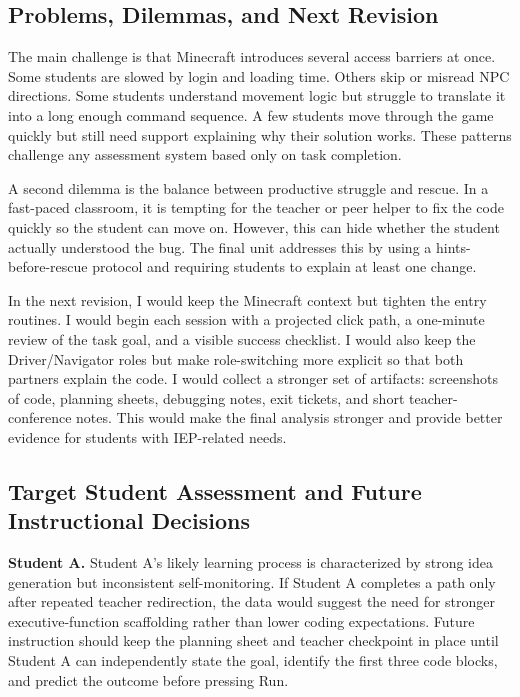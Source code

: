 \documentclass[12pt]{article}
\begin{document}
\subsection{Problems, Dilemmas, and Next Revision}

The main challenge is that Minecraft introduces several access barriers at once. Some students are slowed by login and loading time. Others skip or misread NPC directions. Some students understand movement logic but struggle to translate it into a long enough command sequence. A few students move through the game quickly but still need support explaining why their solution works. These patterns challenge any assessment system based only on task completion.

A second dilemma is the balance between productive struggle and rescue. In a fast-paced classroom, it is tempting for the teacher or peer helper to fix the code quickly so the student can move on. However, this can hide whether the student actually understood the bug. The final unit addresses this by using a hints-before-rescue protocol and requiring students to explain at least one change.

In the next revision, I would keep the Minecraft context but tighten the entry routines. I would begin each session with a projected click path, a one-minute review of the task goal, and a visible success checklist. I would also keep the Driver/Navigator roles but make role-switching more explicit so that both partners explain the code. I would collect a stronger set of artifacts: screenshots of code, planning sheets, debugging notes, exit tickets, and short teacher-conference notes. This would make the final analysis stronger and provide better evidence for students with IEP-related needs.

\subsection{Target Student Assessment and Future Instructional Decisions}

\textbf{Student A.} Student A's likely learning process is characterized by strong idea generation but inconsistent self-monitoring. If Student A completes a path only after repeated teacher redirection, the data would suggest the need for stronger executive-function scaffolding rather than lower coding expectations. Future instruction should keep the planning sheet and teacher checkpoint in place until Student A can independently state the goal, identify the first three code blocks, and predict the outcome before pressing Run.
\end{document}
